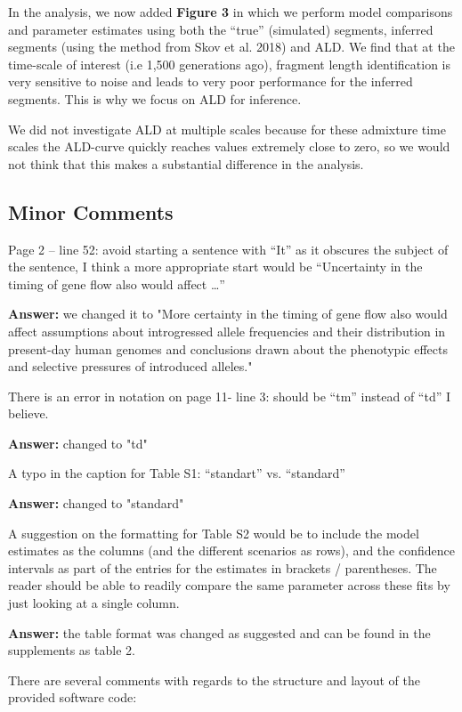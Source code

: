 \documentclass[11pt]{article}
\begin{document}
In the analysis, we now added \textbf{Figure 3} in which we perform model comparisons and parameter estimates using both the ``true'' (simulated) segments, inferred segments (using the method from Skov et al. 2018) and ALD. We find that at the time-scale of interest (i.e 1,500 generations ago), fragment length identification is very sensitive to noise and leads to very poor performance for the inferred segments. This is why we focus on ALD for inference. 

We did not investigate ALD at multiple scales because for these admixture time scales the ALD-curve quickly reaches values extremely close to zero, so we would not think that this makes a substantial difference in the analysis. 



\subsection{Minor Comments}\label{Minor Comments}

Page 2 – line 52: avoid starting a sentence with “It” as it obscures the subject of the sentence, I think a more appropriate start would be “Uncertainty in the timing of gene flow also would affect …”

\textbf{Answer:} we changed it to "More certainty in the timing of gene flow also would affect  assumptions about introgressed allele frequencies and their distribution in present-day human genomes and conclusions drawn about the phenotypic effects and selective pressures of introduced alleles."

There is an error in notation on page 11- line 3: should be “tm” instead of “td” I believe.

\textbf{Answer:} changed to "td"

A typo in the caption for Table S1: “standart” vs. “standard”

\textbf{Answer:} changed to "standard"

A suggestion on the formatting for Table S2 would be to include the model estimates as the columns (and the different scenarios as rows), and the confidence intervals as part of the entries for the estimates in brackets / parentheses. The reader should be able to readily compare the same parameter across these fits by just looking at a single column. 

\textbf{Answer:} the table format was changed as suggested and can be found in the supplements as table 2.

There are several comments with regards to the structure and layout of the provided software code:
\end{document}
